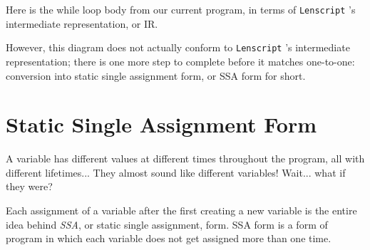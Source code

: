 \documentclass[12pt]{report}
\newcommand{\langname}{Lenscript}
\newcommand{\lang}{\texttt{\langname} }
\newlength{\inprogramwidth}
\begin{document}
Here is the while loop body from our current program, in terms of \lang's intermediate representation, or IR.
\begin{center}
\end{center}

However, this diagram does not actually conform to \lang's intermediate representation; there is one more step to complete before it matches one-to-one: conversion into static single assignment form, or SSA form for short.

\section{Static Single Assignment Form}
\label{sec:codegen-ssa}

A variable has different values at different times throughout the program, all with different lifetimes... They almost sound like different variables! Wait... what if they were?

Each assignment of a variable after the first creating a new variable is the entire idea behind \emph{SSA}, or static single assignment, form. SSA form is a form of program in which each variable does not get assigned more than one time.
\end{document}
